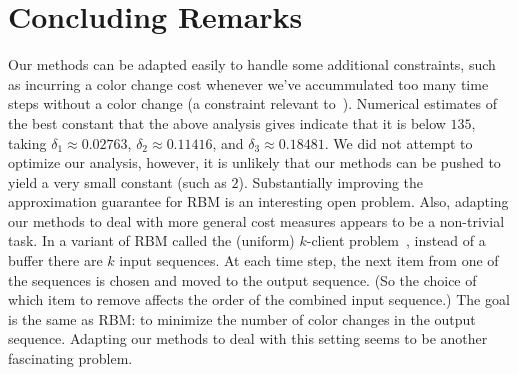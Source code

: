 \documentclass[11pt]{article}
\begin{document}
\section{Concluding Remarks}

Our methods can be adapted easily to handle some
additional constraints, such as incurring a color
change cost whenever we've accummulated too
many time steps without a color change (a constraint
relevant to~\cite{ROADEF2005}).
Numerical estimates of the best constant that the above
analysis gives indicate that it is below $135$, taking
$\delta_1\approx 0.02763$, $\delta_2\approx 0.11416$,
and $\delta_3\approx 0.18481$. We did not
attempt to optimize our analysis, however, it is unlikely
that our methods can be pushed to yield a very small constant
(such as $2$). Substantially improving the approximation
guarantee for RBM is an interesting open problem. Also,
adapting our methods to deal with more general cost measures
appears to be a non-trivial task. In a variant of RBM called the
(uniform) $k$-client problem~\cite{ATUW01}, instead of a buffer
there are $k$ input sequences. At each time step, the next item
from one of the sequences is chosen and moved to the output
sequence. (So the choice of which item to remove affects the order
of the combined input sequence.) The goal is the same as RBM: to
minimize the number of color changes in the output sequence.
Adapting our methods to deal with this setting seems to be another
fascinating problem.

\newpage
\end{document}
